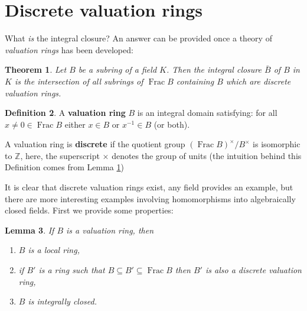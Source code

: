 \documentclass[12pt]{article}
\theoremstyle{plain}
\newtheorem{thm}{Theorem}[subsection] %
\newtheorem{lemma}[thm]{Lemma}
\theoremstyle{definition}
\newtheorem{defn}[thm]{Definition} %
\newcommand{\bb}[1]{\mathbb{#1}}
\begin{document}
	\section{Discrete valuation rings}
	What \emph{is} the integral closure? An answer can be provided once a theory of \emph{valuation rings} has been developed:
	\begin{thm}
		\label{thm:discrete_valuation_intersection}
		Let $B$ be a subring of a field $K$. Then the integral closure $\bar{B}$ of $B$ in $K$ is the intersection of all subrings of $\operatorname{Frac}B$ containing $B$ which are \emph{discrete valuation rings}.
	\end{thm}
	\begin{defn}
		A \textbf{valuation ring} $B$ is an integral domain satisfying: for all $x\neq 0 \in \operatorname{Frac}B$ either $x \in B$ or $x^{-1} \in B$ (or both).
		
		A valuation ring is \textbf{discrete} if the quotient group $(\operatorname{Frac}B)^{\times}/B^\times$ is isomorphic to $\bb{Z}$, here, the superscript $\times$ denotes the group of units (the intuition behind this Definition comes from Lemma \ref{})
	\end{defn}
	It is clear that discrete valuation rings exist, any field provides an example, but there are more interesting examples involving homomorphisms into algebraically closed fields. First we provide some properties:
	\begin{lemma}
		If $B$ is a valuation ring, then
		\begin{enumerate}
			\item\label{lem:discrete_valuation_local} $B$ is a local ring,
			\item\label{lem:discrete_valuation_between} if $B'$ is a ring such that $B \subseteq B' \subseteq \operatorname{Frac}B$ then $B'$ is also a discrete valuation ring,
			\item\label{lem:discrete_valuation_integrally_closed} $B$ is integrally closed.
		\end{enumerate}
	\end{lemma}
\end{document}
